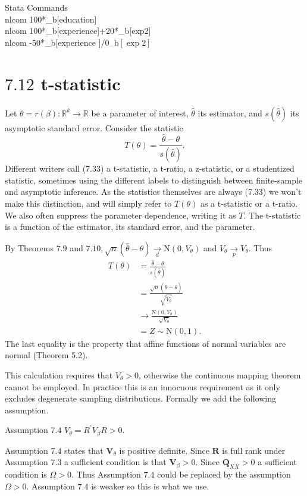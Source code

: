 \documentclass[10pt]{article}
\begin{document}
Stata Commands\\
nlcom 100*\_b[education]\\
nlcom 100*\_b[experience]+20*\_b[exp2]\\
nlcom -50*\_b[experience $] / 0_{-} \mathrm{b}[\exp 2]$

\section{$7.12$ t-statistic}
Let $\theta=r(\beta): \mathbb{R}^{k} \rightarrow \mathbb{R}$ be a parameter of interest, $\widehat{\theta}$ its estimator, and $s(\widehat{\theta})$ its asymptotic standard error. Consider the statistic
$$
T(\theta)=\frac{\widehat{\theta}-\theta}{s(\widehat{\theta})} .
$$
Different writers call (7.33) a t-statistic, a t-ratio, a z-statistic, or a studentized statistic, sometimes using the different labels to distinguish between finite-sample and asymptotic inference. As the statistics themselves are always (7.33) we won't make this distinction, and will simply refer to $T(\theta)$ as a t-statistic or a t-ratio. We also often suppress the parameter dependence, writing it as $T$. The t-statistic is a function of the estimator, its standard error, and the parameter.

By Theorems $7.9$ and $7.10, \sqrt{n}(\widehat{\theta}-\theta) \underset{d}{\longrightarrow} \mathrm{N}\left(0, V_{\theta}\right)$ and $\widehat{V}_{\theta} \underset{p}{\longrightarrow} V_{\theta}$. Thus
$$
\begin{aligned}
T(\theta) &=\frac{\widehat{\theta}-\theta}{s(\widehat{\theta})} \\
&=\frac{\sqrt{n}(\widehat{\theta}-\theta)}{\sqrt{\widehat{V}_{\theta}}} \\
& \rightarrow \frac{\mathrm{N}\left(0, V_{\theta}\right)}{\sqrt{V_{\theta}}} \\
&=Z \sim \mathrm{N}(0,1) .
\end{aligned}
$$
The last equality is the property that affine functions of normal variables are normal (Theorem 5.2).

This calculation requires that $V_{\theta}>0$, otherwise the continuous mapping theorem cannot be employed. In practice this is an innocuous requirement as it only excludes degenerate sampling distributions. Formally we add the following assumption.

Assumption 7.4 $V_{\theta}=R^{\prime} V_{\beta} R>0$.

Assumption $7.4$ states that $\boldsymbol{V}_{\theta}$ is positive definite. Since $\boldsymbol{R}$ is full rank under Assumption $7.3$ a sufficient condition is that $\boldsymbol{V}_{\beta}>0$. Since $\boldsymbol{Q}_{X X}>0$ a sufficient condition is $\Omega>0$. Thus Assumption $7.4$ could be replaced by the assumption $\Omega>0$. Assumption $7.4$ is weaker so this is what we use.
\end{document}
